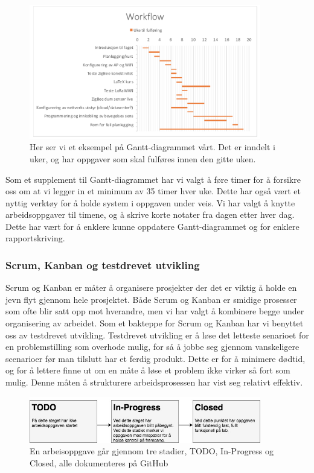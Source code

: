 \documentclass{article}
\begin{document}
\begin{figure}
  \centering
      \includegraphics[width=0.9\textwidth]{gantt}
  \caption{Her ser vi et eksempel på Gantt-diagrammet vårt. Det er inndelt i uker, og har oppgaver som skal fulføres innen den gitte uken.}
\end{figure}

Som et supplement til Gantt-diagrammet har vi valgt å føre timer for å forsikre oss om at vi legger in et minimum av 35 timer hver uke. Dette har også vært et nyttig verktøy for å holde system i oppgaven under veis. Vi har valgt å knytte arbeidsoppgaver til timene, og å skrive korte notater fra dagen etter hver dag. Dette har vært for å enklere kunne oppdatere Gantt-diagrammet og for enklere rapportskriving. 

\subsubsection{Scrum, Kanban og testdrevet utvikling}
Scrum og Kanban er måter å organisere prosjekter der det er viktig å holde en jevn flyt gjennom hele prosjektet. Både Scrum og Kanban er smidige prosesser som ofte blir satt opp mot hverandre, men vi har valgt å kombinere begge under organisering av arbeidet\cite{scrumandkanban}. Som et bakteppe for Scrum og Kanban har vi benyttet oss av testdrevet utvikling. Testdrevet utvikling er å løse det letteste senarioet for en problemstilling som overhode mulig, for så å jobbe seg gjennom vanskeligere scenarioer før man tilslutt har et ferdig produkt. Dette er for å minimere dødtid, og for å lettere finne ut om en måte å løse et problem ikke virker så fort som mulig. Denne måten å strukturere arbeidsprosessen har vist seg relativt effektiv.

\begin{figure}
  \centering
      \includegraphics[width=0.9\textwidth]{ScrumKanban}
  \caption{En arbeisoppgave går gjennom tre stadier, TODO, In-Progress og Closed, alle dokumenteres på GitHub}
\end{figure}
\end{document}
